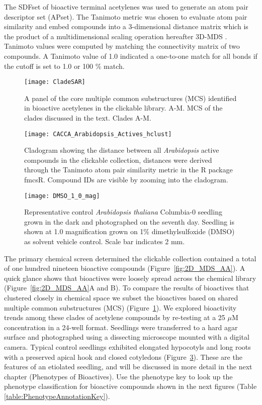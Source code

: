 The SDFset of bioactive terminal acetylenes was used to generate an atom pair descriptor set (APset). The Tanimoto metric was chosen to evaluate atom pair similarity and embed compounds into a 3-dimensional distance matrix which is the product of a multidimensional scaling operation hereafter 3D-MDS \cite{cao2008chemminer}. Tanimoto values were computed by matching the connectivity matrix of two compounds. A Tanimoto value of 1.0 indicated a one-to-one match for all bonds if the cutoff is set to 1.0 or 100 {\%} match.


\begin{figure}
\texttt{[image: CladeSAR]}
\caption{A panel of the core multiple common substructures (MCS) identified in bioactive acetylenes in the clickable library. A-M. MCS of the clades discussed in the text. Clades A-M.}
\label{fig:CladeSAR}
\end{figure}

\clearpage

\begin{figure}\centering
\texttt{[image: CACCA\_Arabidopsis\_Actives\_hclust]}
\caption{Cladogram showing the distance between all {\it Arabidopsis} active compounds in the clickable collection, distances were derived through the Tanimoto atom pair similarity metric in the R package fmcsR. Compound IDs are visible by zooming into the cladogram.}
\label{fig:CACCA_Arabidopsis_Actives_hclust}
\end{figure}


\begin{figure}
\centering
\texttt{[image: DMSO\_1\_0\_mag]}
\caption{Representative control {\it Arabidopsis thaliana} Columbia-0 seedling grown in the dark and photographed on the seventh day. Seedling is shown at 1.0 magnification grown on 1{\%} dimethylsulfoxide (DMSO) as solvent vehicle control. Scale bar indicates 2 mm.}
\label{fig:Control_1_0mag}
\end{figure}

The primary chemical screen determined the clickable collection contained a total of one hundred nineteen bioactive compounds (Figure~\ref{fig:2D_MDS_AA}). A quick glance shows that bioactives were loosely spread across the chemical library (Figure~\ref{fig:2D_MDS_AA}A and B). To compare the results of bioactives that clustered closely in chemical space we subset the bioactives based on shared multiple common substructures (MCS) (Figure~\ref{fig:CladeSAR}). We explored bioactivity trends among these clades of acetylene compounds by re-testing at a 25 $\mu$M concentration in a 24-well format. Seedlings were transferred to a hard agar surface and photographed using a dissecting microscope mounted with a digital camera. Typical control seedlings exhibited elongated hypocotyls and long roots with a preserved apical hook and closed cotyledons (Figure~\ref{fig:Control_1_0mag}). These are the features of an etiolated seedling, and will be discussed in more detail in the next chapter (Phenotypes of Bioactives). Use the phenotype key to look up the phenotype classification for bioactive compounds shown in the next figures (Table \ref{table:PhenotypeAnnotationKey}).

